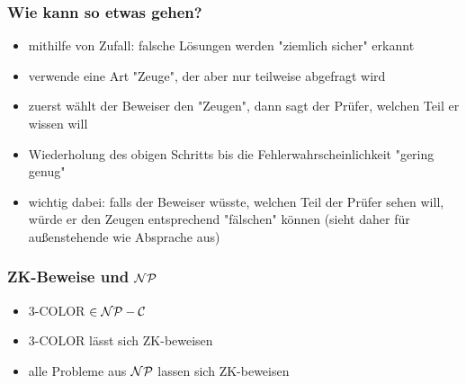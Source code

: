 \documentclass{beamer}
\newcommand{\NP}{\ensuremath \mathcal{NP}}
\newcommand{\NPC}{\ensuremath \mathcal{NP-C}}
\begin{document}
\begin{frame}
\frametitle{Wie kann so etwas gehen?}
\begin{itemize}
\item mithilfe von Zufall: falsche Lösungen werden "ziemlich sicher" erkannt\pause
\item verwende eine Art "Zeuge", der aber nur teilweise abgefragt wird\pause
\item zuerst wählt der Beweiser den "Zeugen", dann sagt der Prüfer, welchen Teil er wissen will\pause
\item Wiederholung des obigen Schritts bis die Fehlerwahrscheinlichkeit "gering genug"\pause
\item wichtig dabei: falls der Beweiser wüsste, welchen Teil der Prüfer sehen will, würde er den Zeugen entsprechend "fälschen" können (sieht daher für außenstehende wie Absprache aus)
\end{itemize}
\end{frame}

\begin{frame}
\frametitle{ZK-Beweise und $\NP$}
\begin{itemize}
\item 3-COLOR $\in\NPC$
\item 3-COLOR lässt sich ZK-beweisen
\item alle Probleme aus $\NP$ lassen sich ZK-beweisen
\end{itemize}
\end{frame}
\end{document}
